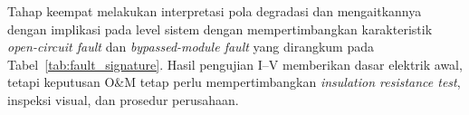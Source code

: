 Tahap keempat melakukan interpretasi pola degradasi dan mengaitkannya dengan
implikasi pada level sistem dengan mempertimbangkan karakteristik
\textit{open-circuit fault} dan \textit{bypassed-module fault} yang dirangkum
pada Tabel~\ref{tab:fault_signature}. Hasil pengujian I--V memberikan dasar
elektrik awal, tetapi keputusan O\&M tetap perlu mempertimbangkan
\textit{insulation resistance test}, inspeksi visual, dan prosedur perusahaan.